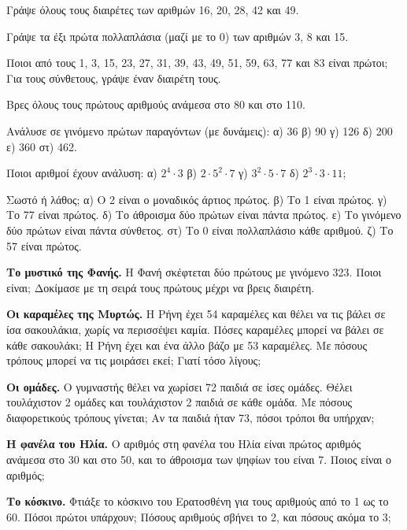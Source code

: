 

\ex Γράψε όλους τους διαιρέτες των αριθμών 16, 20, 28, 42 και 49.

\ex Γράψε τα έξι πρώτα πολλαπλάσια (μαζί με το 0) των αριθμών 3, 8 και 15.

\ex Ποιοι από τους 1, 3, 15, 23, 27, 31, 39, 43, 49, 51, 59, 63, 77 και 83 είναι πρώτοι; Για τους σύνθετους, γράψε έναν διαιρέτη τους.

\ex Βρες όλους τους πρώτους αριθμούς ανάμεσα στο 80 και στο 110.

\ex Ανάλυσε σε γινόμενο πρώτων παραγόντων (με δυνάμεις): α) 36 \quad β) 90 \quad γ) 126 \quad δ) 200 \quad ε) 360 \quad στ) 462.

\ex Ποιοι αριθμοί έχουν ανάλυση: α) $2^4\cdot 3$ \quad β) $2\cdot 5^2\cdot 7$ \quad γ) $3^2\cdot 5\cdot 7$ \quad δ) $2^3\cdot 3\cdot 11$;

\ex Σωστό ή λάθος; α) Ο 2 είναι ο μοναδικός άρτιος πρώτος. \quad β) Το 1 είναι πρώτος. \quad γ) Το 77 είναι πρώτος. \quad δ) Το άθροισμα δύο πρώτων είναι πάντα πρώτος. \quad ε) Το γινόμενο δύο πρώτων είναι πάντα σύνθετος. \quad στ) Το 0 είναι πολλαπλάσιο κάθε αριθμού. \quad ζ) Το 57 είναι πρώτος.


\ex \textbf{Το μυστικό της Φανής.} Η Φανή σκέφτεται δύο πρώτους με γινόμενο 323. Ποιοι είναι; Δοκίμασε με τη σειρά τους πρώτους μέχρι να βρεις διαιρέτη.

\ex \textbf{Οι καραμέλες της Μυρτώς.} Η Ρήνη έχει 54 καραμέλες και θέλει να τις βάλει σε ίσα σακουλάκια, χωρίς να περισσέψει καμία. Πόσες καραμέλες μπορεί να βάλει σε κάθε σακουλάκι; Η Ρήνη έχει και ένα άλλο βάζο με 53 καραμέλες. Με πόσους τρόπους μπορεί να τις μοιράσει εκεί; Γιατί τόσο λίγους;

\ex \textbf{Οι ομάδες.} Ο γυμναστής θέλει να χωρίσει 72 παιδιά σε ίσες ομάδες. Θέλει τουλάχιστον 2 ομάδες και τουλάχιστον 2 παιδιά σε κάθε ομάδα. Με πόσους διαφορετικούς τρόπους γίνεται; Αν τα παιδιά ήταν 73, πόσοι τρόποι θα υπήρχαν;

\ex \textbf{Η φανέλα του Ηλία.} Ο αριθμός στη φανέλα του Ηλία είναι πρώτος αριθμός ανάμεσα στο 30 και στο 50, και το άθροισμα των ψηφίων του είναι 7. Ποιος είναι ο αριθμός;

\ex \textbf{Το κόσκινο.} Φτιάξε το κόσκινο του Ερατοσθένη για τους αριθμούς από το 1 ως το 60. Πόσοι πρώτοι υπάρχουν; Πόσους αριθμούς σβήνει το 2, και πόσους ακόμα το 3;

